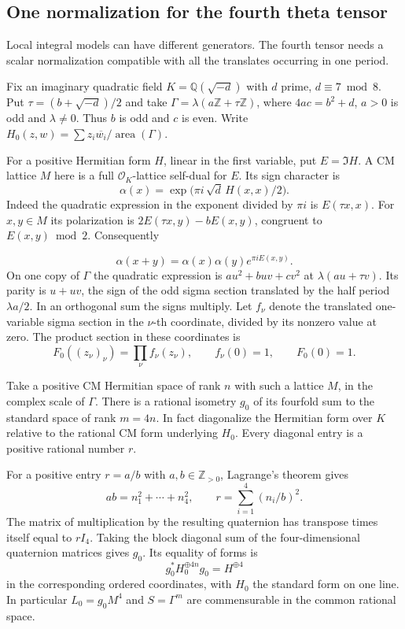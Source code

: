 \subsection{One normalization for the fourth theta tensor}
\label{subsec:theta-normalization}

Local integral models can have different generators. The fourth tensor needs a scalar normalization compatible with all the translates occurring in one period.

Fix an imaginary quadratic field \(K=\mathbb Q(\sqrt{-d})\)
with \(d\) prime, \(d\equiv7\bmod8\). Put
\(\tau=(b+\sqrt{-d})/2\) and take
\(\Gamma=\lambda(a\mathbb Z+\tau\mathbb Z)\), where
\(4ac=b^2+d\), \(a>0\) is odd and \(\lambda\ne0\).
Thus \(b\) is odd and \(c\) is even. Write
\(H_0(z,w)=\sum z_i\overline{w_i}/\operatorname{area}(\Gamma)\).

For a positive Hermitian form \(H\), linear in the first
variable, put \(E=\Im H\). A CM lattice \(M\) here is a full
\(\mathcal O_K\)-lattice self-dual for \(E\). Its sign character is
\[
  \alpha(x)=\exp\big(\pi i\,\sqrt d\,H(x,x)/2\big).
\]
Indeed the quadratic expression in the exponent divided by
\(\pi i\) is \(E(\tau x,x)\). For \(x,y\in M\) its
polarization is \(2E(\tau x,y)-bE(x,y)\), congruent to
\(E(x,y)\bmod2\). Consequently

\[
  \alpha(x+y)=\alpha(x)\alpha(y)e^{\pi i E(x,y)}.
\]
On one copy of \(\Gamma\) the quadratic expression is
\(au^2+buv+cv^2\) at \(\lambda(au+\tau v)\). Its parity is
\(u+uv\), the sign of the odd sigma section translated by
the half period \(\lambda a/2\). In an orthogonal sum the
signs multiply. Let \(f_\nu\) denote the translated one-variable sigma section in the \(\nu\)-th coordinate, divided by its nonzero value at zero. The product section in these coordinates is
\[
  F_0((z_\nu)_\nu)=\prod_\nu f_\nu(z_\nu),\qquad f_\nu(0)=1,\qquad F_0(0)=1.
\]

Take a positive CM Hermitian space of rank \(n\) with such
a lattice \(M\), in the complex scale of \(\Gamma\).
There is a rational isometry \(g_0\) of its fourfold sum to
the standard space of rank \(m=4n\). In fact diagonalize the
Hermitian form over \(K\) relative to the rational CM form
underlying \(H_0\). Every diagonal entry is a positive rational
number \(r\).

For a positive entry \(r=a/b\) with \(a,b\in\mathbb Z_{>0}\), Lagrange's theorem gives
\[
  ab=n_1^2+\cdots+n_4^2,\qquad r=\sum_{i=1}^4(n_i/b)^2.
\]
 The matrix of multiplication by the resulting
quaternion has transpose times itself equal to \(r I_4\).
Taking the block diagonal sum of the four-dimensional
quaternion matrices gives \(g_0\). Its equality of forms is
\[
       g_0^*H_0^{\oplus 4n}g_0=H^{\oplus4}
\]
in the corresponding ordered coordinates, with \(H_0\)
the standard form on one line. In particular \(L_0=g_0 M^4\) and \(S=\Gamma^m\)
are commensurable in the common rational space.

